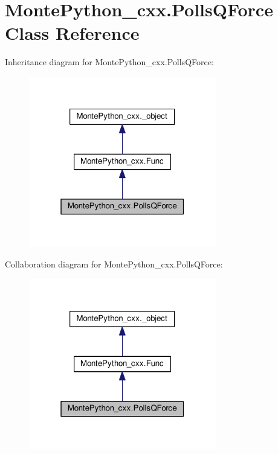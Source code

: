 \hypertarget{classMontePython__cxx_1_1PollsQForce}{}\section{Monte\+Python\+\_\+cxx.\+Polls\+Q\+Force Class Reference}
\label{classMontePython__cxx_1_1PollsQForce}


Inheritance diagram for Monte\+Python\+\_\+cxx.\+Polls\+Q\+Force\+:
\nopagebreak
\begin{figure}[H]
\begin{center}
\leavevmode
\includegraphics[width=232pt]{classMontePython__cxx_1_1PollsQForce__inherit__graph}
\end{center}
\end{figure}


Collaboration diagram for Monte\+Python\+\_\+cxx.\+Polls\+Q\+Force\+:
\nopagebreak
\begin{figure}[H]
\begin{center}
\leavevmode
\includegraphics[width=232pt]{classMontePython__cxx_1_1PollsQForce__coll__graph}
\end{center}
\end{figure}
